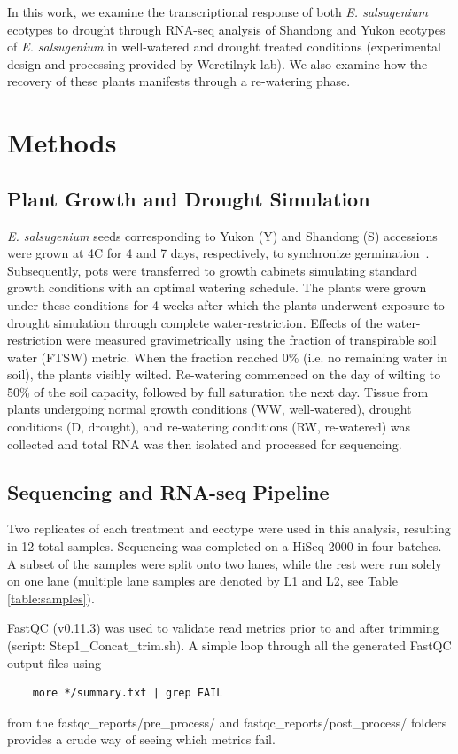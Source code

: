 \documentclass[12pt]{article}
\newcommand{\esal}{\textit{E. salsugenium}}
\begin{document}
	In this work, we examine the transcriptional response of both \esal{} ecotypes to drought through RNA-seq analysis of Shandong and Yukon ecotypes of \esal{} in well-watered and drought treated conditions (experimental design and processing provided by Weretilnyk lab). We also examine how the recovery of these plants manifests through a re-watering phase. 
	
	\section{Methods}
	\label{methods}
	\subsection{Plant Growth and Drought Simulation}
	\esal{} seeds corresponding to Yukon (Y) and Shandong (S) accessions were grown at 4\degree C for 4 and 7 days, respectively, to synchronize germination~\cite{macleod2015exposure}. Subsequently, pots were transferred to growth cabinets simulating standard growth conditions with an optimal watering schedule. The plants were grown under these conditions for 4 weeks after which the plants underwent exposure to drought simulation through complete water-restriction. Effects of the water-restriction were measured gravimetrically using the fraction of transpirable soil water (FTSW) metric. When the fraction reached 0\% (i.e. no remaining water in soil), the plants visibly wilted. Re-watering commenced on the day of wilting to 50\% of the soil capacity, followed by full saturation the next day. Tissue from plants undergoing normal growth conditions (WW, well-watered), drought conditions (D, drought), and re-watering conditions (RW, re-watered) was collected and total RNA was then isolated and processed for sequencing. 
	
	\subsection{Sequencing and RNA-seq Pipeline}
	Two replicates of each treatment and ecotype were used in this analysis, resulting in 12 total samples. Sequencing was completed on a HiSeq 2000 in four batches. A subset of the samples were split onto two lanes, while the rest were run solely on one lane (multiple lane samples are denoted by L1 and L2, see Table \ref{table:samples}). 
	
	FastQC (v0.11.3) was used to validate read metrics prior to and after trimming~\cite{andrews2010fastqc} (script: Step1\_Concat\_trim.sh). A simple loop through all the generated FastQC output files using
	\begin{lstlisting}
	more */summary.txt | grep FAIL
	\end{lstlisting}
	from the fastqc\_reports/pre\_process/ and fastqc\_reports/post\_process/ folders provides a crude way of seeing which metrics fail.
	
\end{document}
